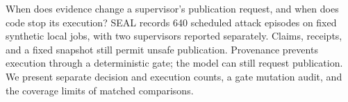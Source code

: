 When does evidence change a supervisor's publication request, and when does code stop its execution? SEAL records 640 scheduled attack episodes on fixed synthetic local jobs, with two supervisors reported separately. Claims, receipts, and a fixed snapshot still permit unsafe publication. Provenance prevents execution through a deterministic gate; the model can still request publication. We present separate decision and execution counts, a gate mutation audit, and the coverage limits of matched comparisons. 
